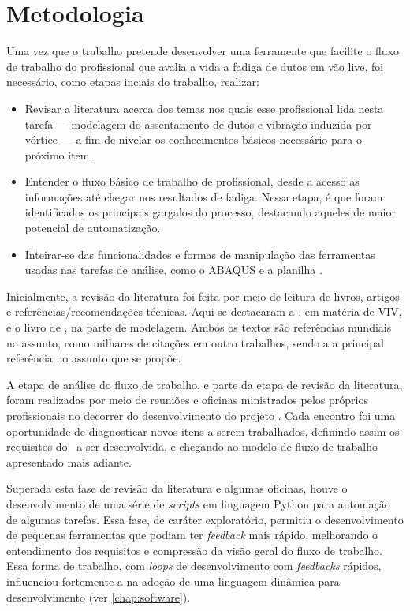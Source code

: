 \chapter{Metodologia}\label{chap:metodologia}


Uma vez que o trabalho pretende desenvolver uma ferramente que facilite o fluxo de trabalho do profissional que avalia a vida a fadiga de dutos em vão live, foi necessário, como etapas inciais do trabalho, realizar:

\begin{itemize}
    \item Revisar a literatura acerca dos temas nos quais esse profissional lida nesta tarefa --- modelagem do assentamento de dutos e vibração induzida por vórtice --- a fim de nivelar os conhecimentos básicos necessário para o próximo item.
    \item Entender o fluxo básico de trabalho de profissional, desde a acesso as informações até chegar nos resultados de fadiga. Nessa etapa, é que foram identificados os principais gargalos do processo, destacando aqueles de maior potencial de automatização.
    \item Inteirar-se das funcionalidades e formas de manipulação das ferramentas usadas nas tarefas de análise, como o ABAQUS e a planilha \fatfree.
\end{itemize}

Inicialmente, a revisão da literatura foi feita por meio de leitura de livros, artigos e referências/recomendações técnicas.
Aqui se destacaram a , em matéria de VIV, e o livro de , na parte de modelagem.
Ambos os textos são referências mundiais no assunto, como milhares de citações em outro trabalhos, sendo a  a principal referência no assunto que se propõe.

A etapa de análise do fluxo de trabalho, e parte da etapa de revisão da literatura, foram realizadas por meio de reuniões e oficinas ministrados pelos próprios profissionais no decorrer do desenvolvimento do projeto \integrispan.
Cada encontro foi uma oportunidade de diagnosticar novos itens a serem trabalhados, definindo assim os requisitos do \frame\  a ser desenvolvida, e chegando ao modelo de fluxo de trabalho apresentado mais adiante.

Superada esta fase de revisão da literatura e algumas oficinas, houve o desenvolvimento de uma série de \textit{scripts} em linguagem Python para automação de algumas tarefas.
Essa fase, de caráter exploratório, permitiu o desenvolvimento de pequenas ferramentas que podiam ter \textit{feedback} mais rápido, melhorando o entendimento dos requisitos e compressão da visão geral do fluxo de trabalho.
Essa forma de trabalho, com \textit{loops} de desenvolvimento com \textit{feedbacks} rápidos, influenciou fortemente a na adoção de uma linguagem dinâmica para desenvolvimento (ver \autoref{chap:software}).

